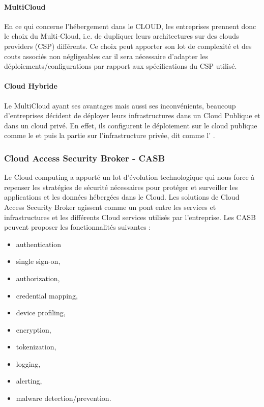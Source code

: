 \paragraph{MultiCloud}
En ce qui concerne l'hébergement dans le CLOUD, les entreprises prennent donc le choix du Multi-Cloud, i.e. de dupliquer leurs architectures sur des clouds providers (CSP) différents. Ce choix peut apporter son lot de complexité et des couts associés non négligeables car il sera nécessaire d'adapter les déploiements/configurations par rapport aux spécifications du CSP utilisé.
\paragraph{Cloud Hybride}
Le MultiCloud ayant ses avantages mais aussi ses inconvénients, beaucoup d'entreprises décident de déployer leurs infrastructures dans un Cloud Publique et dans un cloud privé. En effet, ils configurent le déploiement sur le cloud publique comme le  et puis la partie sur l'infrastructure privée, dit  comme l' .


\subsubsection{Cloud Access Security Broker - CASB}
Le Cloud computing a apporté un lot d'évolution technologique qui nous force à repenser les stratégies de sécurité nécessaires pour protéger et surveiller les applications et les données hébergées dans le Cloud.
Les solutions de Cloud Access Security Broker agissent comme un pont entre les services et infrastructures  et les différents Cloud services utilisés par l'entreprise.
Les CASB peuvent proposer les fonctionnalités suivantes : 
\begin{itemize}
    \item authentication
    \item single sign-on, 
   \item  authorization, 
   \item  credential mapping, 
    \item device profiling, 
    \item encryption, 
    \item tokenization, 
   \item  logging, 
    \item alerting, 
    \item malware detection/prevention.
\end{itemize}

